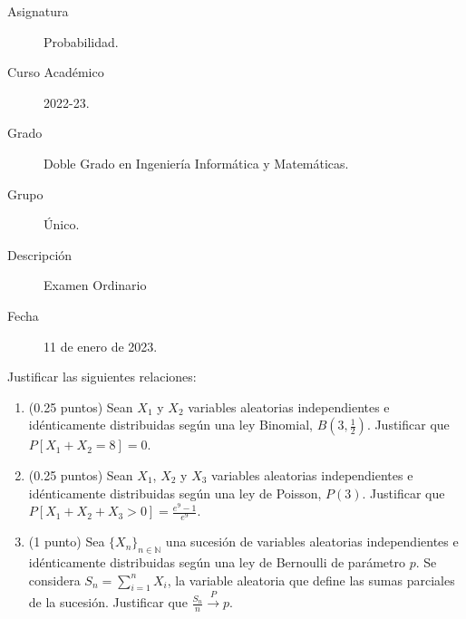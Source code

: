 \documentclass[12pt]{article}
\begin{document}

    
    

    \begin{description}
        \item[Asignatura] Probabilidad.
        \item[Curso Académico] 2022-23.
        \item[Grado] Doble Grado en Ingeniería Informática y Matemáticas.
        \item[Grupo] Único.
        \item[Descripción] Examen Ordinario 
        \item[Fecha] 11 de enero de 2023.
    
    \end{description}
    \newpage

\begin{ejercicio}[1.5 puntos]
        Justificar las siguientes relaciones:
        \begin{enumerate}[label=(\alph*)]
            \item (0.25 puntos) Sean $X_1$ y $X_2$ variables aleatorias independientes e idénticamente distribuidas según una ley Binomial, $B(3, \frac{1}{2})$. Justificar que $P[X_1 + X_2 = 8] = 0$.
            \item (0.25 puntos) Sean $X_1$, $X_2$ y $X_3$ variables aleatorias independientes e idénticamente distribuidas según una ley de Poisson, $P(3)$. Justificar que $P[X_1 + X_2 + X_3 > 0] = \frac{e^9 - 1}{e^9}$.
            \item (1 punto) Sea $\{X_n\}_{n \in \mathbb{N}}$ una sucesión de variables aleatorias independientes e idénticamente distribuidas según una ley de Bernoulli de parámetro $p$. Se considera $S_n = \sum_{i=1}^n X_i$, la variable aleatoria que define las sumas parciales de la sucesión. Justificar que $\frac{S_n}{n} \xrightarrow{P} p$.
        \end{enumerate}
    \end{ejercicio}
\end{document}
